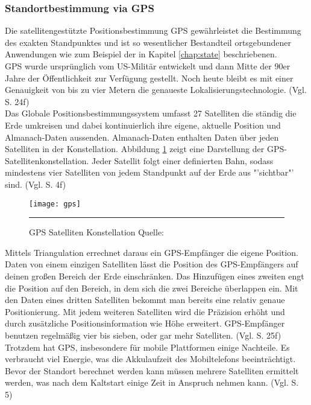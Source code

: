 \subsubsection{Standortbestimmung via \gls{GPS}}
Die satellitengestützte Positionsbestimmung \gls{GPS} gewährleistet die Bestimmung des exakten Standpunktes und ist so wesentlicher Bestandteil ortsgebundener Anwendungen wie zum Beispiel der in Kapitel \ref{chap:state} beschriebenen. \\
\gls{GPS} wurde ursprünglich vom US-Militär entwickelt und dann Mitte der 90er Jahre der Öffentlichkeit zur Verfügung gestellt. Noch heute bleibt es mit einer Genauigkeit von bis zu vier Metern die genaueste Lokalisierungstechnologie. (Vgl. \cite{gps} S. 24f)\\
Das Globale Positionsbestimmungssystem umfasst 27 Satelliten die ständig die Erde umkreisen und dabei kontinuierlich ihre eigene, aktuelle Position und Almanach-Daten aussenden. Almanach-Daten enthalten Daten über jeden Satelliten in der Konstellation. Abbildung \ref{fig:gps} zeigt eine Darstellung der GPS-Satellitenkonstellation. Jeder Satellit folgt einer definierten Bahn, sodass mindestens vier Satelliten von jedem Standpunkt auf der Erde aus "'sichtbar"' sind. (Vgl. \cite{location} S. 4f)
\begin{figure}[H]  
    \centering  
    \texttt{[image: gps]} 
    \rule{35em}{0.5pt}
    \caption[GPS Satelliten Konstellation]{GPS Satelliten Konstellation  Quelle: \cite{fig:gps}}
    \label{fig:gps}
\end{figure}
Mittels Triangulation errechnet daraus ein \gls{GPS}-Empfänger die eigene Position. Daten von einem einzigen Satelliten lässt die Position des \gls{GPS}-Empfängers auf deinen großen Bereich der Erde einschränken. Das Hinzufügen eines zweiten engt die Position auf den Bereich, in dem sich die zwei Bereiche überlappen ein. Mit den Daten eines dritten Satelliten bekommt man bereits eine relativ genaue Positionierung. Mit jedem weiteren Satelliten wird die Präzision erhöht und durch zusätzliche Positionsinformation wie Höhe erweitert. \gls{GPS}-Empfänger benutzen regelmäßig vier bis sieben, oder gar mehr Satelliten. (Vgl. \cite{gps} S. 25f)\\
Trotzdem hat \gls{GPS}, insbesondere für mobile Plattformen einige Nachteile. Es verbraucht viel Energie, was die Akkulaufzeit des Mobiltelefons beeinträchtigt. Bevor der Standort berechnet werden kann müssen mehrere Satelliten ermittelt werden, was nach dem Kaltstart einige Zeit in Anspruch nehmen kann. (Vgl. \cite{location} S. 5)
